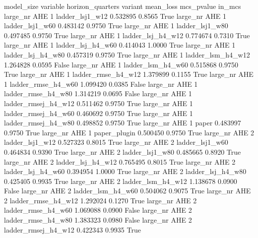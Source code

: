 model_size variable  horizon_quarters             variant   mean_loss  mcs_pvalue  in_mcs
  large_nr      AHE                 1     ladder_lsj1_w12    0.532895      0.8565    True
  large_nr      AHE                 1     ladder_lsj1_w60    0.483142      0.9750    True
  large_nr      AHE                 1     ladder_lsj1_w80    0.497485      0.9750    True
  large_nr      AHE                 1   ladder_lsj_h4_w12    0.774674      0.7310    True
  large_nr      AHE                 1   ladder_lsj_h4_w60    0.414043      1.0000    True
  large_nr      AHE                 1   ladder_lsj_h4_w80    0.457319      0.9750    True
  large_nr      AHE                 1   ladder_lsm_h4_w12    1.264828      0.0595   False
  large_nr      AHE                 1   ladder_lsm_h4_w60    0.515868      0.9750    True
  large_nr      AHE                 1  ladder_rmse_h4_w12    1.379899      0.1155    True
  large_nr      AHE                 1  ladder_rmse_h4_w60    1.099420      0.0385   False
  large_nr      AHE                 1  ladder_rmse_h4_w80    1.314219      0.0695   False
  large_nr      AHE                 1 ladder_rmsej_h4_w12    0.511462      0.9750    True
  large_nr      AHE                 1 ladder_rmsej_h4_w60    0.460692      0.9750    True
  large_nr      AHE                 1 ladder_rmsej_h4_w80    0.498852      0.9750    True
  large_nr      AHE                 1               paper    0.483997      0.9750    True
  large_nr      AHE                 1        paper_plugin    0.500450      0.9750    True
  large_nr      AHE                 2     ladder_lsj1_w12    0.527323      0.8015    True
  large_nr      AHE                 2     ladder_lsj1_w60    0.464834      0.9390    True
  large_nr      AHE                 2     ladder_lsj1_w80    0.485665      0.8920    True
  large_nr      AHE                 2   ladder_lsj_h4_w12    0.765495      0.8015    True
  large_nr      AHE                 2   ladder_lsj_h4_w60    0.394954      1.0000    True
  large_nr      AHE                 2   ladder_lsj_h4_w80    0.425405      0.9935    True
  large_nr      AHE                 2   ladder_lsm_h4_w12    1.138678      0.0900   False
  large_nr      AHE                 2   ladder_lsm_h4_w60    0.504062      0.9075    True
  large_nr      AHE                 2  ladder_rmse_h4_w12    1.292024      0.1270    True
  large_nr      AHE                 2  ladder_rmse_h4_w60    1.069088      0.0900   False
  large_nr      AHE                 2  ladder_rmse_h4_w80    1.383323      0.0980   False
  large_nr      AHE                 2 ladder_rmsej_h4_w12    0.422343      0.9935    True
